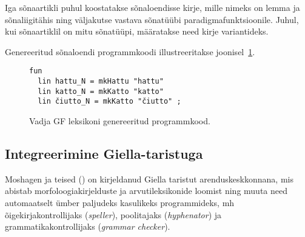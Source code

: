 \documentclass[12pt,a4paper]{article}
\begin{document}
Iga sõnaartikli puhul koostatakse sõnaloendisse kirje, mille nimeks on lemma ja sõnaliigi\-tähis ning väljakutse vastava sõnatüübi paradigma\-funktsioonile. Juhul, kui sõna\-artiklil on mitu sõnatüüpi, määratakse need kirje variantideks.


Genereeritud sõnaloendi programm\-koodi illustreeritakse joonisel~\ref{code:gf-lexicon}. %

\begin{figure}[ht]
  \center
  \begin{verbatim}
fun
  lin hattu_N = mkHattu "hattu"
  lin katto_N = mkKatto "katto"
  lin čiutto_N = mkKatto "čiutto" ;
\end{verbatim}
\caption{Vadja GF leksikoni genereeritud programmkood.
  \label{code:gf-lexicon}}
\end{figure}








\subsection{Integreerimine Giella-taristuga}
\label{sec:giella}
% 


Moshagen ja teised (\citeyear[344]{moshagen_building_2013}) on kirjeldanud Giella taristut arendus\-keskkonnana, mis abistab morfoloogia\-kirjelduste ja arvuti\-leksikonide loomist ning muuta need automaatselt ümber paljudeks kasulikeks programmideks, mh õige\-kirja\-kontrollijaks (\textit{speller}), poolitajaks (\textit{hyphenator}) ja grammatika\-kontrollijaks (\textit{grammar checker}). 
\end{document}
